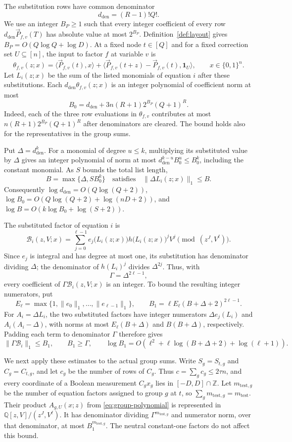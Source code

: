 \documentclass[11pt,reqno]{amsart}
\numberwithin{equation}{section}
\theoremstyle{definition}\newtheorem{definition}[theorem]{Definition}
\theoremstyle{remark}\newtheorem{remark}[theorem]{Remark}
\renewcommand{\le}{\leqslant}
\renewcommand{\ge}{\geqslant}
\begin{document}
The substitution rows have common denominator
\[
 d_{\mathrm{den}}=(R-1)!Q!.
\]
We use an integer $B_P\ge1$ such that every integer coefficient of every
row $d_{\mathrm{den}}\vec{P}_{f,v}(T)$ has absolute value at most $2^{B_P}$.
Definition~\ref{def:layout} gives $B_P=O(Q\log Q+\log D)$.
At a fixed node $t\in[Q]$ and for a fixed correction set $U\subseteq[n]$,
the input to factor $f$ at variable $v$ is
\[
 \theta_{f,v}(z;x)=\langle \vec{P}_{f,v}(t), x\rangle+
       \bigl\langle \vec{P}_{f,v}(t+z)-\vec{P}_{f,v}(t),\mathbf1_U\bigr\rangle,
 \qquad x\in\{0,1\}^n.
\]
Let $L_i(z;x)$ be the sum of the listed monomials of equation $i$
after these substitutions. Each $d_{\mathrm{den}}\theta_{f,v}(z;x)$
is an integer polynomial of coefficient norm at most
\[
 B_0=d_{\mathrm{den}}+3n(R+1)2^{B_P}(Q+1)^R .
\]
Indeed, each of the three row evaluations in $\theta_{f,v}$
contributes at most $n(R+1)2^{B_P}(Q+1)^R$ after denominators are
cleared. The bound holds also for the representatives in the group sums.

Put $\Delta=d_{\mathrm{den}}^k$. For a monomial of degree $u\le k$,
multiplying its substituted value by $\Delta$ gives an integer
polynomial of norm at most $d_{\mathrm{den}}^{k-u}B_0^u\le B_0^k$,
including the constant monomial. As $S$ bounds the total list length,
\[
 B=\max\{\Delta,SB_0^k\}
 \quad\text{satisfies}\quad \|\Delta L_i(z;x)\|_1\le B .
\]
Consequently $\log d_{\mathrm{den}}=O(Q\log(Q+2))$,
$\log B_0=O(Q\log(Q+2)+\log(nD+2))$, and
$\log B=O(k\log B_0+\log(S+2))$.

The substituted factor of equation $i$ is
\[
 \mathcal B_i(z,V;x)=\sum_{j=0}^{\ell-1}
       e_j\bigl(L_i(z;x)\bigr)h\bigl(L_i(z;x)\bigr)^jV^j
       \pmod{(z^J,V^\ell)}.
\]
Since $e_j$ is integral and has degree at most one, its substitution
has denominator dividing $\Delta$; the denominator of
$h(L_i)^j$ divides $\Delta^{2j}$. Thus, with
\[
 \Gamma=\Delta^{2\ell-1},
\]
every coefficient of $\Gamma\mathcal B_i(z,V;x)$ is an integer.
To bound the resulting integer numerators, put
\[
 E_\ell=\max\{1,\|e_0\|_1,\ldots,\|e_{\ell-1}\|_1\},\qquad
 B_1=\ell E_\ell(B+\Delta+2)^{2\ell-1}.
\]
For $A_i=\Delta L_i$, the two substituted factors have integer
numerators $\Delta e_j(L_i)$ and $A_i(A_i-\Delta)$, with norms at most
$E_\ell(B+\Delta)$ and $B(B+\Delta)$, respectively. Padding each term
to denominator $\Gamma$ therefore gives
\[
 \|\Gamma\mathcal B_i\|_1\le B_1,\qquad B_1\ge\Gamma,
 \qquad
 \log B_1=O\!\left(\ell^2+
       \ell\log(B+\Delta+2)+\log(\ell+1)\right).
\]

We next apply these estimates to the actual group sums.
Write $S_g=S_{t,g}$ and $C_g=C_{t,g}$, and let $c_g$ be the number
of rows of $C_g$. Thus $c=\sum_g c_g\le2\tau n$, and every coordinate
of a Boolean measurement $C_gx_g$ lies in $[-D,D]\cap\mathbb Z$.
Let $m_{\mathrm{test},g}$ be the number of equation factors assigned
to group $g$ at $t$, so $\sum_g m_{\mathrm{test},g}=m_{\mathrm{test}}$.
Their product $A_{g,U}(x;z)$ from \eqref{eq:group-polynomial} is
represented in $\mathbb Q[z,V]/(z^J,V^\ell)$. It has denominator
dividing $\Gamma^{m_{\mathrm{test},g}}$ and numerator norm, over that
denominator, at most $B_1^{m_{\mathrm{test},g}}$. The neutral
constant-one factors do not affect this bound.
\end{document}
